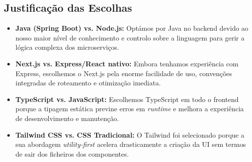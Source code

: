 \subsection{Justificação das Escolhas}
\begin{itemize}
    \item \textbf{Java (Spring Boot) vs. Node.js:} Optámos por Java no backend devido ao nosso maior nível de conhecimento e controlo sobre a linguagem para gerir a lógica complexa dos microserviços.
    \item \textbf{Next.js vs. Express/React nativo:} Embora tenhamos experiência com Express, escolhemos o Next.js pela enorme facilidade de uso, convenções integradas de roteamento e otimização imediata.
    \item \textbf{TypeScript vs. JavaScript:} Escolhemos TypeScript em todo o frontend porque a tipagem estática previne erros em \textit{runtime} e melhora a experiência de desenvolvimento e manutenção.
    \item \textbf{Tailwind CSS vs. CSS Tradicional:} O Tailwind foi selecionado porque a sua abordagem \textit{utility-first} acelera drasticamente a criação da UI sem termos de sair dos ficheiros dos componentes.
\end{itemize}